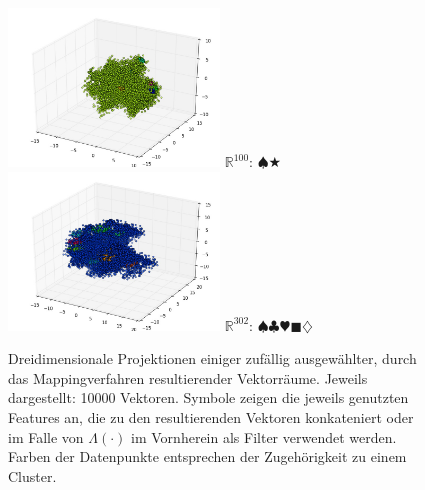\begin{itemize}
\begin{figure}[h]
\begin{multicols}{2}
    \columnbreak

    \includegraphics[width=0.5\textwidth]{../img/clusters_occ1.jpg}
    $\mathbb{R}^{100}$: $\spadesuit\bigstar$
    \includegraphics[width=0.5\textwidth]{../img/clusters_occ100_dist_eucl_cos_concat.jpg}
    $\mathbb{R}^{302}$: $\spadesuit\clubsuit\varheart\blacksquare\diamondsuit$
  \end{multicols}

  \flushleft
  \caption[Dreidimensionale Projektionen einiger durch das Mappingverfahren resultierender Vektorräume]{Dreidimensionale
   Projektionen einiger zufällig ausgewählter, durch das Mappingverfahren resultierender Vektorräume.
   Jeweils dargestellt: 10000 Vektoren. Symbole zeigen die jeweils genutzten Features an, die zu den resultierenden
   Vektoren konkateniert oder im Falle von $\Lambda(\cdot)$ im Vornherein als Filter verwendet werden. Farben
   der Datenpunkte entsprechen der Zugehörigkeit zu einem Cluster.\label{fig:proj_map}}
\end{figure}

\end{itemize}

